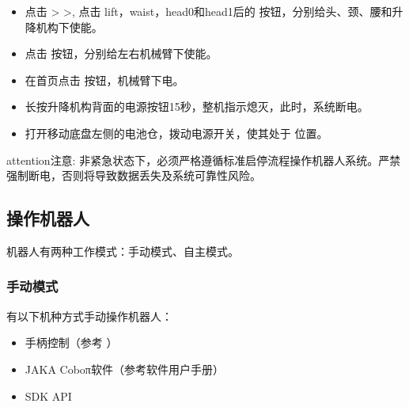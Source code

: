 \documentclass[a4paper,11pt,english,openany,oneside]{sphinxmanual}
\begin{document}
\sphinxAtStartPar
{}
\begin{itemize}
\item {} 
\sphinxAtStartPar
点击  >  >, 点击 lift，waist，head0和head1后的  按钮，分别给头、颈、腰和升降机构下使能。

\item {} 
\sphinxAtStartPar
点击  按钮，分别给左右机械臂下使能。

\item {} 
\sphinxAtStartPar
在首页点击  按钮，机械臂下电。

\item {} 
\sphinxAtStartPar
长按升降机构背面的电源按钮15秒，整机指示熄灭，此时，系统断电。

\item {} 
\sphinxAtStartPar
打开移动底盘左侧的电池仓，拨动电源开关，使其处于  位置。

\end{itemize}

\begin{sphinxadmonition}{attention}{注意:}
\sphinxAtStartPar
非紧急状态下，必须严格遵循标准启停流程操作机器人系统。严禁强制断电，否则将导致数据丢失及系统可靠性风险。
\end{sphinxadmonition}


\subsection{操作机器人}
\label{\detokenize{08 _u5b89_u88c5_u4e0e_u8c03_u8bd5:id85}}\label{\detokenize{08 _u5b89_u88c5_u4e0e_u8c03_u8bd5:id86}}
\sphinxAtStartPar
机器人有两种工作模式：手动模式、自主模式。


\subsubsection{手动模式}
\label{\detokenize{08 _u5b89_u88c5_u4e0e_u8c03_u8bd5:id87}}\label{\detokenize{08 _u5b89_u88c5_u4e0e_u8c03_u8bd5:id88}}
\sphinxAtStartPar
有以下机种方式手动操作机器人：
\begin{itemize}
\item {} 
\sphinxAtStartPar
手柄控制（参考 {\hyperref[\detokenize{07 _u6280_u672f_u89c4_u683c:id41}]{}}）

\item {} 
\sphinxAtStartPar
JAKA Coboπ软件（参考软件用户手册）

\item {} 
\sphinxAtStartPar
SDK API

\end{itemize}
\end{document}
